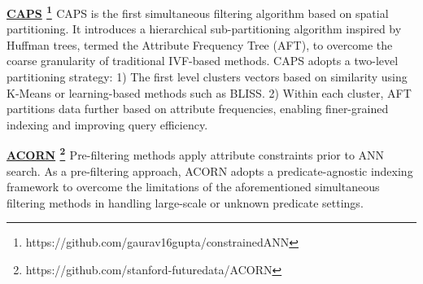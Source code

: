 \documentclass[sigconf, nonacm]{acmart}
\begin{document}
	
	\noindent\textbf{\underline{CAPS} \footnote{https://github.com/gaurav16gupta/constrainedANN} \cite{CAPS}}
	CAPS is the first simultaneous filtering algorithm based on spatial partitioning.
	It introduces a hierarchical sub-partitioning algorithm inspired by Huffman trees, termed the Attribute Frequency Tree (AFT), to overcome the coarse granularity of traditional IVF-based methods. CAPS adopts a two-level partitioning strategy:  
	1) The first level clusters vectors based on similarity using K-Means or learning-based methods such as BLISS. 2) Within each cluster, AFT partitions data further based on attribute frequencies, enabling finer-grained indexing and improving query efficiency.
	
	\noindent\textbf{\underline{ACORN} \footnote{https://github.com/stanford-futuredata/ACORN} \cite{ACORN}}
	Pre-filtering methods apply attribute constraints prior to ANN search. As a pre-filtering approach, ACORN adopts a predicate-agnostic indexing framework to overcome the limitations of the aforementioned simultaneous filtering methods in handling large-scale or unknown predicate settings.
\end{document}
